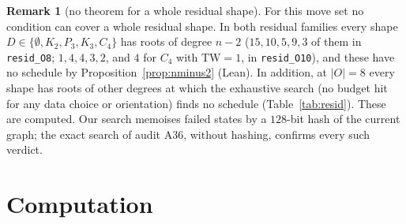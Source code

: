 \documentclass[11pt]{amsart}
\theoremstyle{definition}
\newtheorem{remark}[theorem]{Remark}
\begin{document}
\begin{remark}[no theorem for a whole residual shape]\label{rem:noshape}
For this move set no condition can cover a whole residual shape. In both residual families every
shape $D\in\{\emptyset,K_2,P_3,K_3,C_4\}$ has roots of degree $n-2$ ($15,10,5,9,3$ of them in
\texttt{resid\_O8}; $1,4,4,3,2$, and $4$ for $C_4$ with $\mathrm{TW}=1$, in \texttt{resid\_O10}), and these
have no schedule by Proposition~\ref{prop:nminus2} (Lean). In addition, at $|O|=8$ every shape has
roots of other degrees at which the exhaustive search (no budget hit for any data choice or
orientation) finds no schedule (Table~\ref{tab:resid}). These are computed. Our search memoises failed
states by a $128$-bit hash of the current graph; the exact search of audit A36, without hashing,
confirms every such verdict.
\end{remark}

\section{Computation}\label{sec:comp}
\end{document}
